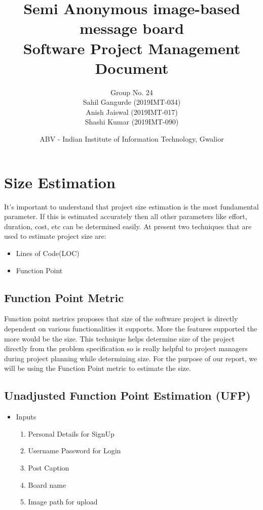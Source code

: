 \documentclass[12pt]{report}
\title{Semi Anonymous image-based message board \\ 
        \large Software Project Management Document}
\author{Group No. 24\\Sahil Gangurde (2019IMT-034)\\Anish Jaiswal (2019IMT-017)\\Shashi Kumar (2019IMT-090)}
\date{ABV - Indian Institute of Information Technology, Gwalior}
\begin{document}
\maketitle

\newpage
\tableofcontents
\newpage

\chapter{Size Estimation}
It’s important to understand that project size estimation is the most fundamental parameter. If this is estimated accurately then all other parameters like effort, duration, cost, etc can be determined easily.
At present two techniques that are used to estimate project size are:
\begin{itemize}
    \item Lines of Code(LOC)
    \item Function Point
\end{itemize}

\section{Function Point Metric}
Function point metrics proposes that size of the software project is directly dependent on various functionalities it supports. More the features supported the more would be the size. This technique helps determine size of the project directly from the problem specification so is really helpful to project managers during project planning while determining size. For the purpose of our report, we will be using the Function Point metric to estimate the size.

\section{Unadjusted Function Point Estimation (UFP)}

\begin{itemize}
    \item Inputs
    \begin{enumerate}
        \item Personal Details for SignUp
        \item Username Password for Login
        \item Post Caption
        \item Board name
        \item Image path for upload
    \end{enumerate}
\end{itemize}
\end{document}
